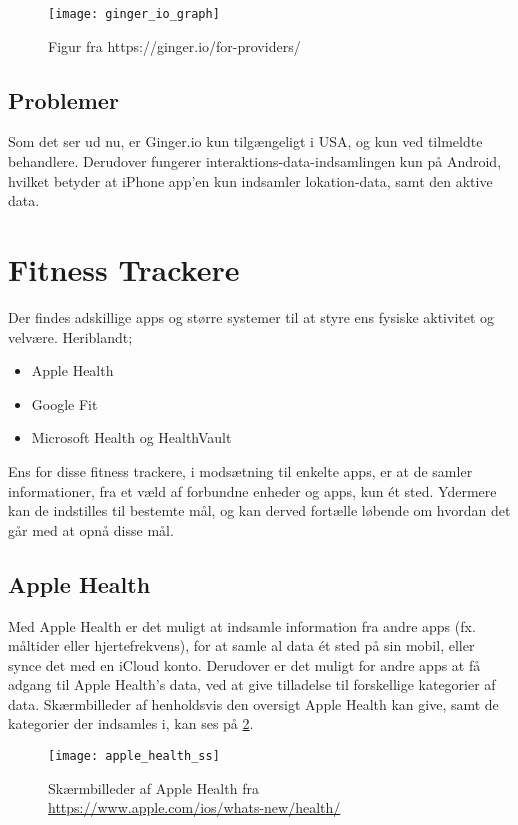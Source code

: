 \begin{figure}[h]
\centering
\texttt{[image: ginger\_io\_graph]}
\caption{Figur fra https://ginger.io/for-providers/}
\label{eksisterende_systemer:ginger_io_graf}
\end{figure}

\subsection{Problemer}
Som det ser ud nu, er Ginger.io kun tilgængeligt i USA, og kun ved tilmeldte behandlere.
Derudover fungerer interaktions-data-indsamlingen kun på Android, hvilket betyder at iPhone app'en kun indsamler lokation-data, samt den aktive data.

\section{Fitness Trackere}
Der findes adskillige apps og større systemer til at styre ens fysiske aktivitet og velvære.
Heriblandt;
\begin{itemize}
\item Apple Health\cite{apple_health}
\item Google Fit\cite{google_fit}\cite{google_fit_api}
\item Microsoft Health\cite{ms_health} og HealthVault\cite{ms_health_vault}\cite{ms_health_vault_api}
\end{itemize}

Ens for disse fitness trackere, i modsætning til enkelte apps, er at de samler informationer, fra et væld af forbundne enheder og apps, kun ét sted.
Ydermere kan de indstilles til bestemte mål, og kan derved fortælle løbende om hvordan det går med at opnå disse mål.

\subsection{Apple Health}
Med Apple Health er det muligt at indsamle information fra andre apps (fx. måltider eller hjertefrekvens), for at samle al data ét sted på sin mobil, eller synce det med en iCloud konto.
Derudover er det muligt for andre apps at få adgang til Apple Health's data, ved at give tilladelse til forskellige kategorier af data.
Skærmbilleder af henholdsvis den oversigt Apple Health kan give, samt de kategorier der indsamles i, kan ses på \cref{eksisterende_systemer:apple_health_ss}.

\begin{figure}
\centering
\texttt{[image: apple\_health\_ss]}
\caption{Skærmbilleder af Apple Health fra \url{https://www.apple.com/ios/whats-new/health/}}
\label{eksisterende_systemer:apple_health_ss}
\end{figure}

